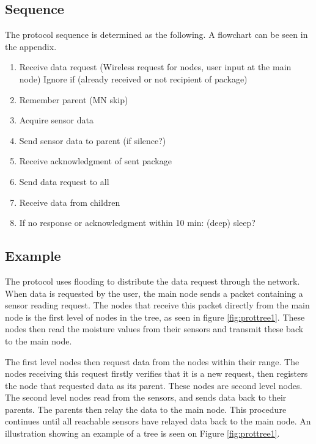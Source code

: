 \subsection{Sequence}
The protocol sequence is determined as the following. A flowchart can be seen in the appendix.
\begin{enumerate}
	\item Receive data request (Wireless request for nodes, user input at the main node)
		\subitem Ignore if (already received or not recipient of package)
	\item Remember parent (MN skip)
	\item Acquire sensor data
	\item Send sensor data to parent (if silence?)
	\item Receive acknowledgment of sent package
	\item Send data request to all
	\item Receive data from children
	\item If no response or acknowledgment within 10 min: (deep) sleep?
\end{enumerate}



\subsection*{Example}
The protocol uses flooding to distribute the data request through the network. 
When data is requested by the user, the main node sends a packet containing a sensor reading request. 
The nodes that receive this packet directly from the main node is the first level of nodes in the tree, as seen in figure \ref{fig:prottree1}. 
These nodes then read the moisture values from their sensors and transmit these back to the main node. 

The first level nodes then request data from the nodes within their range. 
The nodes receiving this request firstly verifies that it is a new request, then registers the node that requested data as its parent. 
These nodes are second level nodes. The second level nodes read from the sensors, and sends data back to their parents. The parents then relay the data to the main node. 
This procedure continues until all reachable sensors have relayed data back to the main node.
An illustration showing an example of a tree is seen on Figure \ref{fig:prottree1}.

